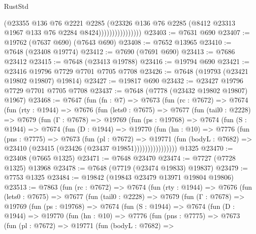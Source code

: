 \begin{lexlean}{RustStd}
\begin{coremodule}
{\begin{coremodule}
{{{{{{{{{{{{{{{{{{{{{{{{{{{{{{{{{{{{{{{{{{{{{{{{{{{{{                              (@23355
                                @136
                                @76
                                @2221
                                @2285
                                (@23326
                                  @136
                                  @76
                                  @2285
                                  (@8412 @23313 @1967 @133 @76 @2284 @8424))))))))))))))))
@23403 := @7631 @690
@23407 := @19762 (@7637 @690) (@7643 @690)
@23408 := @7652 @13965
@23410 := @7648 (@23408 @19774)
@23412 := @7690 (@7691 @690)
@23413 := @7686 @23412
@23415 := @7648 (@23413 @19788)
@23416 := @19794 @690
@23421 := @23416 @19796 @7729 @7701 @7705 @7708
@23426 := @7648 (@19793 (@23421 @19802 @19807) @19814)
@23427 := @19817 @690
@23432 := @23427 @19796 @7729 @7701 @7705 @7708
@23437 := @7648 (@7778 (@23432 @19802 @19807) @1967)
@23468 := @7647
    (fun (fn : @7) =>
    @7673
      (fun (rc : @7672) =>
      @7674
        (fun (rty : @1944) =>
        @7676
          (fun (lets0 : @7675) =>
          @7677
            (fun (tail0 : @2228) =>
            @7679
              (fun (Γ : @7678) =>
              @19769
                (fun (ps : @19768) =>
                @7674
                  (fun (S : @1944) =>
                  @7674
                    (fun (D : @1944) =>
                    @19770
                      (fun (hn : @10) =>
                      @7776
                        (fun (pns : @7775) =>
                        @7673
                          (fun (pl : @7672) =>
                          @19771
                            (fun (bodyL : @7682) =>
                            @23410 (@23415 (@23426 (@23437 @19851))))))))))))))))
    @1325
@23470 := @23408 (@7665 @1325)
@23471 := @7648 @23470
@23474 := @7727 (@7728 @1325) @13968
@23478 := @7648 (@7719 (@23474 @19833) @19837)
@23479 := @7753 @1325
@23484 := @19842 (@19843 @23479 @13971 @19804 @19806)
@23513 := @7863
    (fun (rc : @7672) =>
    @7674
      (fun (rty : @1944) =>
      @7676
        (fun (lets0 : @7675) =>
        @7677
          (fun (tail0 : @2228) =>
          @7679
            (fun (Γ : @7678) =>
            @19769
              (fun (ps : @19768) =>
              @7674
                (fun (S : @1944) =>
                @7674
                  (fun (D : @1944) =>
                  @19770
                    (fun (hn : @10) =>
                    @7776
                      (fun (pns : @7775) =>
                      @7673
                        (fun (pl : @7672) =>
                        @19771
                          (fun (bodyL : @7682) =>
}}}}}}}}}}}}}}}}}}}}}}}}}}}}}}}}}}}}}}}}}}}}}}}}}}}}}
\end{coremodule}}
\end{coremodule}
\end{lexlean}
